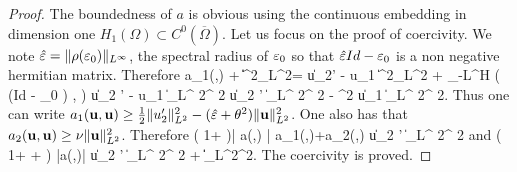\begin{proof}
	The boundedness of $a$ is obvious using the continuous embedding in dimension
	one  $H_1(\Omega)\subset C^0(\overline \Omega)$. Let us focus on the proof of coercivity. 
	We note ${\hat{{\bf \varepsilon}}} =  \|\rho({\bf \varepsilon}_0)\|_{L^\infty}$, the spectral radius of ${\bf \varepsilon}_0$ so that
	${\hat{{\bf \varepsilon}}} Id- {\bf \varepsilon}_0 $ is a non negative hermitian matrix.
	Therefore
	\be 
	a_1(\ubf,\ubf) + \heps\|\ubf\|^2_{L^2}= \|u_2' - \imath \theta u_1 \|^2_{L^2} + \int_{-L}^{H} \left( (\heps Id - \eps_0 ) \ubf, \overline{\ubf} \right)  \geq \|u_2 ' - \imath \theta u_1 \|_{L^ 2}^ 2
	\geq {} \|u_2 '  \|_{L^ 2}^ 2 -
	\theta ^2 \| u_1 \|_{L^ 2}^ 2.
	\ee
	Thus one can write
	$
	a_1({\bf u},{\bf u})  \geq \frac{1}{2}\|u_2'\|^2_{L^2}-  ({\hat{{\bf \varepsilon}}}  +  \theta^2) \| {\bf u} \|_{L^2}^2$.
	One also has that
	$
	a_2 ({\bf u} ,{\bf u}) \geq \nu \| {\bf u} \|_{L^2}^2$. 
	Therefore
	\ben
	\left(  1+  \nu  \right)\left| a(\ubf,\ubf) \right| \geq
	a_1(\ubf,\ubf)+\nu a_2(\ubf,\ubf) \geq  {} \|u_2 '  \|_{L^ 2}^ 2
	\een
	and
	\ben
	\left(  1+  \nu + \nu \right) \left|a(\ubf,\ubf)\right| \geq{} \|u_2 '  \|_{L^ 2}^ 2
	+
	\| \ubf \|_{L^2}^2.
	\een
	The coercivity is proved.

\end{proof}

